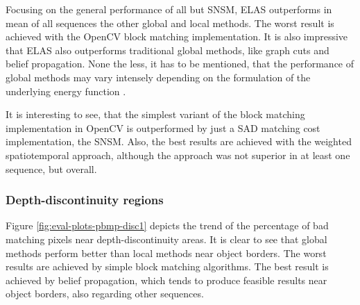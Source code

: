 \noindent Focusing on the general performance of all but SNSM, ELAS outperforms in mean of all sequences the other global and local methods.
The worst result is achieved with the OpenCV block matching implementation.
It is also impressive that ELAS also outperforms traditional global methods, like graph cuts and belief propagation.
None the less, it has to be mentioned, that the performance of global methods may vary intensely depending on the formulation of the underlying energy function \citep{cyganek2011introduction, szeliski2008comparative, scharstein2006middlebury}.

\begin{table}[h!]
\centering
{}
\caption[Result table for general performance]{Result table for general performance, focusing on PBMP$_{noc,1px}$}
\label{fig:eval:general:performance2}
\end{table}

\noindent It is interesting to see, that the simplest variant of the block matching implementation in OpenCV is outperformed by just a SAD matching cost implementation, the SNSM.
Also, the best results are achieved with the weighted spatiotemporal approach, although the approach was not superior in at least one sequence, but overall.

\subsubsection{Depth-discontinuity regions}

Figure \ref{fig:eval-plots-pbmp-disc1} depicts the trend of the percentage of bad matching pixels near depth-discontinuity areas.
It is clear to see that global methods perform better than local methods near object borders.
The worst results are achieved by simple block matching algorithms.
The best result is achieved by belief propagation, which tends to produce feasible results near object borders, also regarding other sequences.


